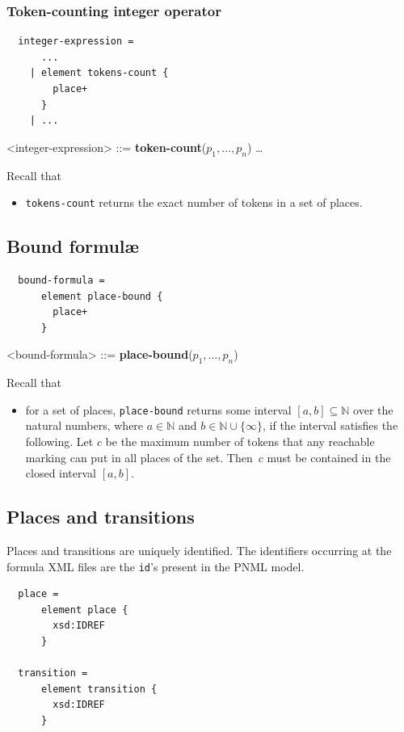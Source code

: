 \documentclass[10pt,english,a4paper]{article}
\newcommand\set[1]           {{\{ #1 \mathclose \}}}
\newcommand\N                {\mathbb{N}}
\newcommand\atomplacebnd[1]  {\textbf{place-bound}(#1)}
\newcommand\atomtokenscnt[1] {\textbf{token-count}(#1)}
\newcommand\mysubsection[1]{\color{sectioncolor}\subsection{#1}\color{defaultcolor}}
\begin{document}
\subsubsection{Token-counting integer operator}

\begin{multicols}{2}
\begin{lstlisting}
  integer-expression =
      ...
    | element tokens-count {
        place+
      }
    | ...
\end{lstlisting}
\columnbreak
\begin{grammar}
<integer-expression> ::=
     \atomtokenscnt{$p_1, \ldots, p_n$}
\alt \ldots
\end{grammar}
\end{multicols}

Recall that
\begin{itemize}
  \item \lstinline!tokens-count! returns the exact number of tokens in a set of places.
\end{itemize}

\mysubsection{Bound formulæ}

\begin{multicols}{2}
\begin{lstlisting}
  bound-formula = 
      element place-bound {
        place+
      }
\end{lstlisting}
\columnbreak
\begin{grammar}
<bound-formula> ::=
     \atomplacebnd{$p_1, \ldots, p_n$}
\end{grammar}
\end{multicols}

Recall that
\begin{itemize}
\item for a set of places, \lstinline!place-bound! returns some interval
  $[a,b] \subseteq \N$ over the natural numbers,
  where $a \in \N$ and $b \in \N \cup \set \infty$, if
  the interval satisfies the following.
  Let $c$ be the maximum number of tokens that any reachable marking can put in all places of the set.
  Then~$c$ must be contained in the closed interval $[a,b]$.
\end{itemize}

\mysubsection{Places and transitions}

Places and transitions are uniquely identified. The identifiers occurring at
the formula XML files are the \texttt{id}'s present in the PNML model.

\begin{lstlisting}
  place =
      element place {
        xsd:IDREF
      }

  transition =
      element transition {
        xsd:IDREF
      }
\end{lstlisting}
\end{document}
